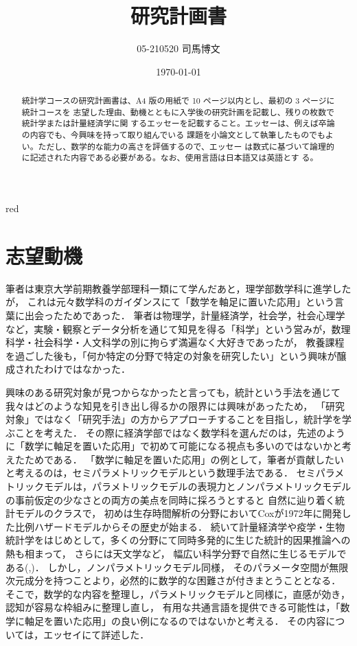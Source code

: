 \documentclass[uplatex, dvipdfmx]{jsarticle}
\title{研究計画書}
\author{05-210520 司馬博文}
\date{\today}
\begin{document}
\begin{tbox}{red}{}
    \begin{abstract}
        統計学コースの研究計画書は、A4 版の用紙で 10 ページ以内とし、最初の 3 ページに統計コースを
        志望した理由、動機とともに入学後の研究計画を記載し、残りの枚数で統計学または計量経済学に関
        するエッセーを記載すること。エッセーは、例えば卒論の内容でも、今興味を持って取り組んでいる
        課題を小論文として執筆したものでもよい。ただし、数学的な能力の高さを評価するので、エッセー
        は数式に基づいて論理的に記述された内容である必要がある。なお、使用言語は日本語又は英語とす
        る。
    \end{abstract}
\end{tbox}

\section*{志望動機}

筆者は東京大学前期教養学部理科一類にて学んだあと，理学部数学科に進学したが，
これは元々数学科のガイダンスにて「数学を軸足に置いた応用」という言葉に出会ったためであった．
筆者は物理学，計量経済学，社会学，社会心理学など，実験・観察とデータ分析を通じて知見を得る「科学」という営みが，数理科学・社会科学・人文科学の別に拘らず満遍なく大好きであったが，
教養課程を過ごした後も，「何か特定の分野で特定の対象を研究したい」という興味が醸成されたわけではなかった．

興味のある研究対象が見つからなかったと言っても，統計という手法を通じて我々はどのような知見を引き出し得るかの限界には興味があったため，
「研究対象」ではなく「研究手法」の方からアプローチすることを目指し，統計学を学ぶことを考えた．
その際に経済学部ではなく数学科を選んだのは，先述のように「数学に軸足を置いた応用」で初めて可能になる視点も多いのではないかと考えたためである．
「数学に軸足を置いた応用」の例として，筆者が貢献したいと考えるのは，セミパラメトリックモデルという数理手法である．
セミパラメトリックモデルは，パラメトリックモデルの表現力とノンパラメトリックモデルの事前仮定の少なさとの両方の美点を同時に採ろうとすると
自然に辿り着く統計モデルのクラスで，
初めは生存時間解析の分野においてCoxが1972年に開発した比例ハザードモデルからその歴史が始まる．
続いて計量経済学や疫学・生物統計学をはじめとして，多くの分野にて同時多発的に生じた統計的因果推論への熱も相まって，
さらには天文学など，
幅広い科学分野で自然に生じるモデルである(\cite{Bickel},\cite{Bickel and Robins})．
しかし，ノンパラメトリックモデル同様，
そのパラメータ空間が無限次元成分を持つことより，必然的に数学的な困難さが付きまとうこととなる．
そこで，数学的な内容を整理し，パラメトリックモデルと同様に，直感が効き，認知が容易な枠組みに整理し直し，
有用な共通言語を提供できる可能性は，「数学に軸足を置いた応用」の良い例になるのではないかと考える．
その内容については，エッセイにて詳述した．
\end{document}
